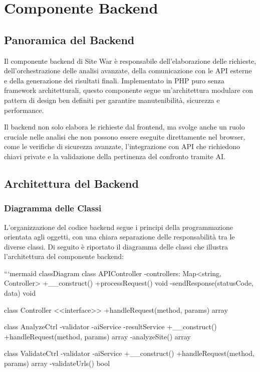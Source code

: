 \chapter{Componente Backend}

\section{Panoramica del Backend}
Il componente backend di Site War è responsabile dell'elaborazione delle richieste, dell'orchestrazione delle analisi avanzate, della comunicazione con le API esterne e della generazione dei risultati finali. Implementato in PHP puro senza framework architetturali, questo componente segue un'architettura modulare con pattern di design ben definiti per garantire manutenibilità, sicurezza e performance.

Il backend non solo elabora le richieste dal frontend, ma svolge anche un ruolo cruciale nelle analisi che non possono essere eseguite direttamente nel browser, come le verifiche di sicurezza avanzate, l'integrazione con API che richiedono chiavi private e la validazione della pertinenza del confronto tramite AI.

\section{Architettura del Backend}

\subsection{Diagramma delle Classi}
L'organizzazione del codice backend segue i principi della programmazione orientata agli oggetti, con una chiara separazione delle responsabilità tra le diverse classi. Di seguito è riportato il diagramma delle classi che illustra l'architettura del componente backend:

```mermaid
classDiagram
    class APIController {
        -controllers: Map<string, Controller>
        +__construct()
        +processRequest() void
        -sendResponse(statusCode, data) void
    }
    
    class Controller {
        <<interface>>
        +handleRequest(method, params) array
    }
    
    class AnalyzeCtrl {
        -validator
        -aiService
        -resultService
        +__construct()
        +handleRequest(method, params) array
        -analyzeSite() array
    }
    
    class ValidateCtrl {
        -validator
        -aiService
        +__construct()
        +handleRequest(method, params) array
        -validateUrls() bool
    }
    
